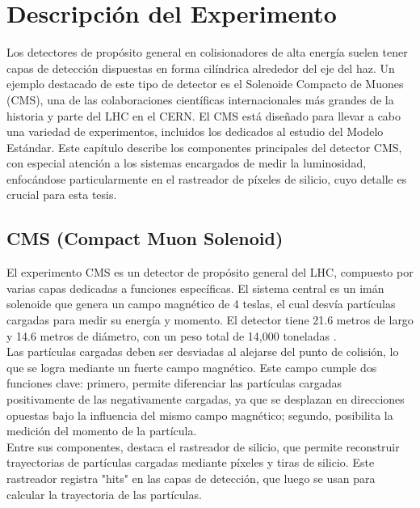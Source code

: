 \chapter{Descripción del Experimento}
 
 Los detectores de propósito general en colisionadores de alta energía suelen tener capas de detección dispuestas en forma cilíndrica alrededor del eje del haz. Un ejemplo destacado de este tipo de detector es el Solenoide Compacto de Muones (CMS), una de las colaboraciones científicas internacionales más grandes de la historia y parte del LHC en el CERN. El CMS está diseñado para llevar a cabo una variedad de experimentos, incluidos los dedicados al estudio del Modelo Estándar. Este capítulo describe los componentes principales del detector CMS, con especial atención a los sistemas encargados de medir la luminosidad, enfocándose particularmente en el rastreador de píxeles de silicio, cuyo detalle es crucial para esta tesis.
 
\section{CMS (Compact Muon Solenoid)}

El experimento CMS es un detector de propósito general del LHC, compuesto por varias capas dedicadas a funciones específicas. El sistema central es un imán solenoide que genera un campo magnético de 4 teslas, el cual desvía partículas cargadas para medir su energía y momento. El detector tiene 21.6 metros de largo y 14.6 metros de diámetro, con un peso total de 14,000 toneladas \cite{CMS_Exp_2008}.\\

Las partículas cargadas deben ser desviadas al alejarse del punto de colisión, lo que se logra mediante un fuerte campo magnético. Este campo cumple dos funciones clave: primero, permite diferenciar las partículas cargadas positivamente de las negativamente cargadas, ya que se desplazan en direcciones opuestas bajo la influencia del mismo campo magnético; segundo, posibilita la medición del momento de la partícula.\\

Entre sus componentes, destaca el rastreador de silicio, que permite reconstruir trayectorias de partículas cargadas mediante píxeles y tiras de silicio. Este rastreador registra "hits" en las capas de detección, que luego se usan para calcular la trayectoria de las partículas.\\

